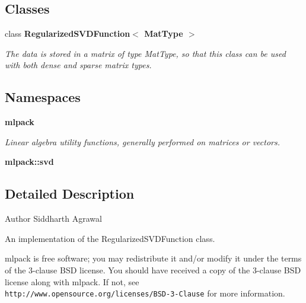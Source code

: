 \subsection*{Classes}
\begin{DoxyCompactItemize}
\item 
class \textbf{ Regularized\+S\+V\+D\+Function$<$ Mat\+Type $>$}
\begin{DoxyCompactList}\small\item\em The data is stored in a matrix of type Mat\+Type, so that this class can be used with both dense and sparse matrix types. \end{DoxyCompactList}\end{DoxyCompactItemize}
\subsection*{Namespaces}
\begin{DoxyCompactItemize}
\item 
 \textbf{ mlpack}
\begin{DoxyCompactList}\small\item\em Linear algebra utility functions, generally performed on matrices or vectors. \end{DoxyCompactList}\item 
 \textbf{ mlpack\+::svd}
\end{DoxyCompactItemize}


\subsection{Detailed Description}
\begin{DoxyAuthor}{Author}
Siddharth Agrawal
\end{DoxyAuthor}
An implementation of the Regularized\+S\+V\+D\+Function class.

mlpack is free software; you may redistribute it and/or modify it under the terms of the 3-\/clause B\+SD license. You should have received a copy of the 3-\/clause B\+SD license along with mlpack. If not, see {\tt http\+://www.\+opensource.\+org/licenses/\+B\+S\+D-\/3-\/\+Clause} for more information. 